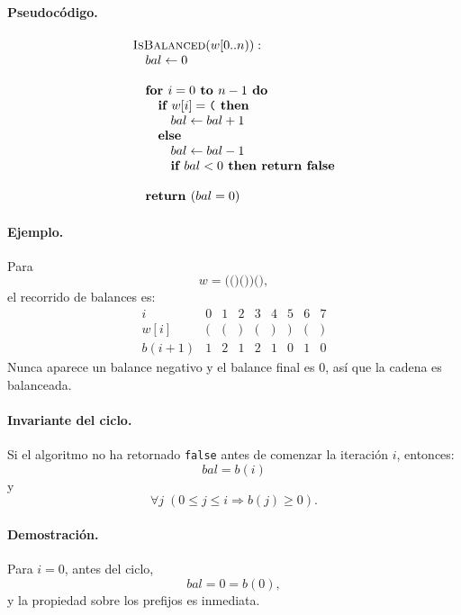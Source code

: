 \documentclass[11pt]{article}
\begin{document}
\paragraph{Pseudocódigo.}
\[
\begin{array}{l}
\textsc{IsBalanced}(w[0..n)):\\
\quad bal \gets 0 \\
\\
\quad \textbf{for } i = 0 \textbf{ to } n-1 \textbf{ do}\\
\quad \quad \textbf{if } w[i] = \texttt{(} \textbf{ then}\\
\quad \quad \quad bal \gets bal + 1\\
\quad \quad \textbf{else}\\
\quad \quad \quad bal \gets bal - 1\\
\quad \quad \quad \textbf{if } bal < 0 \textbf{ then return false}\\
\\
\quad \textbf{return } (bal = 0)
\end{array}
\]

\paragraph{Ejemplo.}
Para
\[
w=\texttt{(()())()},
\]
el recorrido de balances es:
\[
\begin{array}{c|cccccccc}
i & 0 & 1 & 2 & 3 & 4 & 5 & 6 & 7\\
\hline
w[i] & \texttt{(} & \texttt{(} & \texttt{)} & \texttt{(} & \texttt{)} & \texttt{)} & \texttt{(} & \texttt{)}\\
b(i+1) & 1 & 2 & 1 & 2 & 1 & 0 & 1 & 0
\end{array}
\]
Nunca aparece un balance negativo y el balance final es \(0\), así que la cadena es
balanceada.

\paragraph{Invariante del ciclo.}
Si el algoritmo no ha retornado \texttt{false} antes de comenzar la iteración \(i\),
entonces:
\[
bal=b(i)
\]
y
\[
\forall j\; (0\leq j\leq i \Rightarrow b(j)\geq 0).
\]

\paragraph{Demostración.}
Para \(i=0\), antes del ciclo,
\[
bal=0=b(0),
\]
y la propiedad sobre los prefijos es inmediata.
\end{document}
